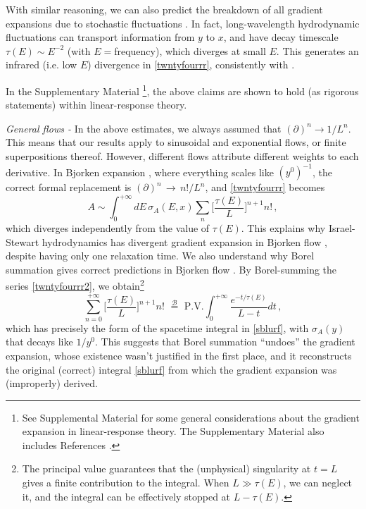 \documentclass[a4paper, amsfonts, amssymb, amsmath, reprint, showkeys, twoside,notitlepage]{revtex4-2}
\begin{document}
With similar reasoning, we can also predict the breakdown of all gradient expansions due to stochastic fluctuations \cite{KovtunStickiness2011}. In fact, long-wavelength hydrodynamic fluctuations can transport information from $y$ to $x$, and have decay timescale $\tau(E)\sim E^{-2}$ (with $E{=}$frequency), which diverges at small $E$. This generates an infrared (i.e. low $E$) divergence in \eqref{twntyfourrr}, consistently with \cite{KovtunStickiness2011}.

\newpage

In the Supplementary Material \footnote{See Supplemental Material for some general considerations about the gradient expansion in linear-response theory. The Supplementary Material also
includes References \cite{Steffe_book,jackson_classical_1999,HellerBounds2023,GavassinoBounds2023,Denicol_Relaxation_2011,GavassinoBurgers2023}.}, the above claims are shown to hold (as rigorous statements) within linear-response theory.

\textit{General flows -} In the above estimates, we always assumed that $(\partial)^n \rightarrow 1/L^{n}$. This means that our results apply to sinusoidal and exponential flows, or finite superpositions thereof. However, different flows attribute different weights to each derivative. In Bjorken expansion \cite{BjorkenFlow1983}, where everything scales like $(y^0)^{-1}$, the correct formal replacement is $(\partial)^n \, {\rightarrow} \, n!/L^n$, and \eqref{twntyfourrr} becomes
\begin{equation}\label{twntyfourrr2}
    A \sim \int_0^{+\infty} \! \! \! dE \, \sigma_A(E,x) \sum_n \bigg[\dfrac{\tau(E)}{L} \bigg]^{n+1} n! \, ,
\end{equation}
which diverges independently from the value of $\tau(E)$. This explains why Israel-Stewart hydrodynamics has divergent gradient expansion in Bjorken flow \cite{Romatschke2018FarFrom}, despite having only one relaxation time. We also understand why Borel summation gives correct predictions in Bjorken flow \cite{HellerAttractors2015}. By Borel-summing the series \eqref{twntyfourrr2}, we obtain\footnote{The principal value guarantees that the (unphysical) singularity at $t=L$ gives a finite contribution to the integral. When $L \gg \tau(E)$, we can neglect it, and the integral can be effectively stopped at $L-\tau(E)$.}
\begin{equation}
    \sum_{n=0}^{+\infty} \bigg[\dfrac{\tau(E)}{L} \bigg]^{n+1} n! \, \, \stackrel{\mathcal{B}}{=} \, \, \text{P.V.}\! \! \int_0^{+\infty} \dfrac{e^{-t/\tau(E)}}{L-t}  dt \, ,
\end{equation}
which has precisely the form of the spacetime integral in \eqref{sblurf}, with $\sigma_A(y)$ that decays like $1/y^0$. This suggests that Borel summation ``undoes'' the gradient expansion, whose existence wasn't justified in the first place, and it reconstructs the original (correct) integral \eqref{sblurf} from which the gradient expansion was (improperly) derived.
\end{document}
